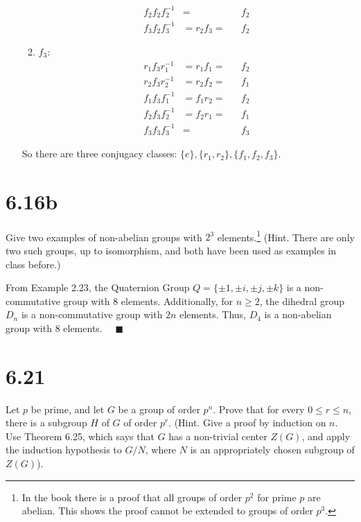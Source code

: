 \documentclass[12pt]{article}
\newcommand{\qed}{\quad \blacksquare}
\begin{document}
\begin{enumerate}
\begin{multicols}{2}
\begin{enumerate}
\begin{align*}
                            f_2 f_2 f_2^{-1} &= &&f_2\\
                            f_3 f_2 f_3^{-1} &= r_2 f_3 =&& f_2
                        \end{align*}
                    \item $f_3$:
                        \begin{align*}
                            r_1 f_3 r_1^{-1} &= r_1 f_1 = &&f_2\\
                            r_2 f_3 r_2^{-1} &= r_2 f_2 = &&f_1\\
                            f_1 f_3 f_1^{-1} &= f_1 r_2 = &&f_2\\
                            f_2 f_3 f_2^{-1} &= f_2 r_1 = &&f_1\\
                            f_3 f_3 f_3^{-1} &= &&f_3
                        \end{align*}
                \end{enumerate}
            \end{multicols}
            
            So there are three conjugacy classes: $\boxed{\{e\}, \{r_1, r_2\}, \{f_1, f_2, f_3\}}$.

        \color{black}
    
\end{enumerate}
\pagebreak

\section*{6.16b} Give two examples of non-abelian groups with $2^3$ elements.\footnote{In the book there is a proof that all groups of order $p^2$ for prime $p$ are abelian. This shows the proof cannot be extended to groups of order $p^3$.} (Hint. There are only two such groups, up to isomorphism, and both have been used as examples in class before.)

    \color{blue}
        From Example 2.23, the Quaternion Group $Q = \{\pm 1, \pm i, \pm j, \pm k\}$ is a non-commutative group with 8 elements. Additionally, for $n \geq 2$, the dihedral group $D_n$ is a non-commutative group with $2n$ elements. Thus, $D_4$ is a non-abelian group with $8$ elements. $\qed$
    \color{black}

\pagebreak

\section*{6.21} 
Let $p$ be prime, and let $G$ be a group of order $p^n$. Prove that for every $0 \leq r \leq n$, there is a subgroup $H$ of $G$ of order $p^r$. (Hint. Give a proof by induction on $n$. Use Theorem 6.25, which says that $G$ has a non-trivial center $Z(G)$, and apply the induction hypothesis to $G/N$, where $N$ is an appropriately chosen subgroup of $Z(G)$).
\end{document}
